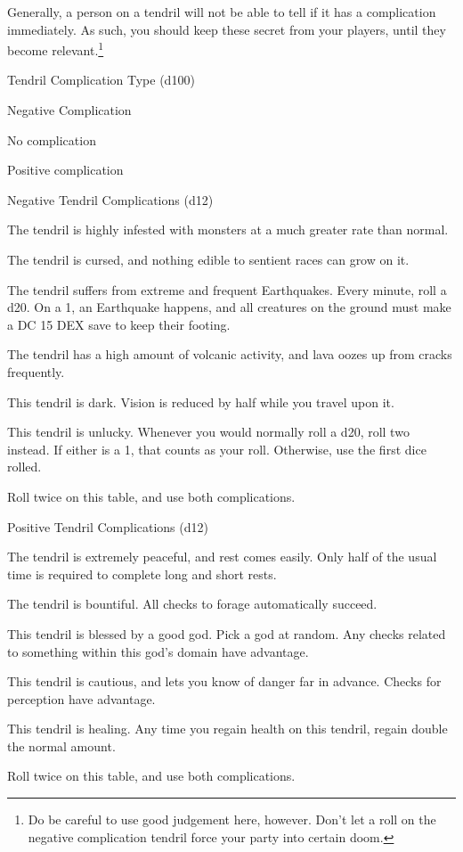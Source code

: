 \begin{multicols*}{2}
Generally, a person on a tendril will not be able to tell if it has a complication immediately.
As such, you should keep these secret from your players, until they become relevant.\footnote{Do be careful to use good judgement here, however. Don't let a roll on the negative complication tendril force your party into certain doom.}

\begin{rolltable}{Tendril Complication Type (d100)}
\item[1-3] Negative Complication
\item[4-97] No complication
\item[98-100] Positive complication
\end{rolltable}


\begin{rolltable}{Negative Tendril Complications (d12)}
\item[1-2] The tendril is highly infested with monsters at a much greater rate than normal.
\item[3-4] The tendril is cursed, and nothing edible to sentient races can grow on it.
\item[5-6] The tendril suffers from extreme and frequent Earthquakes.
Every minute, roll a d20.
On a 1, an Earthquake happens, and all creatures on the ground must make a DC 15 DEX save to keep their footing.
\item[7-8] The tendril has a high amount of volcanic activity, and lava oozes up from cracks frequently.
\item[9-10] This tendril is dark.
Vision is reduced by half while you travel upon it.
\item[11] This tendril is unlucky.
Whenever you would normally roll a d20, roll two instead.
If either is a 1, that counts as your roll.
Otherwise, use the first dice rolled.
\item[12] Roll twice on this table, and use both complications.
\end{rolltable}


\begin{rolltable}{Positive Tendril Complications (d12)}
\item[1-2] The tendril is extremely peaceful, and rest comes easily.
Only half of the usual time is required to complete long and short rests.
\item[3-4] The tendril is bountiful.
All checks to forage automatically succeed.
\item[5-6] This tendril is blessed by a good god.
Pick a god at random.
Any checks related to something within this god's domain have advantage.
\item[7-8] This tendril is cautious, and lets you know of danger far in advance.
Checks for perception have advantage.
\item[9-10] This tendril is healing.
Any time you regain health on this tendril, regain double the normal amount.
\item[12] Roll twice on this table, and use both complications.
\end{rolltable}


\end{multicols*}
